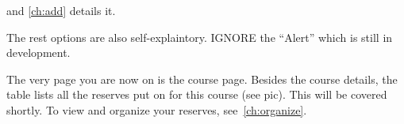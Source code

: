 and \autoref{ch:add} details it.

The rest options are also self-explaintory. {\imp IGNORE} the ``Alert'' which is still in development. 

The very page you are now on is the course page. Besides the course details, the table lists all the reserves put on for this course (see pic). This will be covered shortly. To view and organize your reserves, see~\autoref{ch:organize}. 